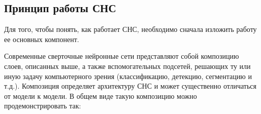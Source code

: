 \subsection{Принцип работы СНС}

Для того, чтобы понять, как работает СНС, необходимо сначала изложить работу ее основных компонент.





Современные сверточные нейронные сети представляют собой композицию слоев, описанных выше, а также вспомогательных подсетей, решающих ту или иную задачу компьютерного зрения (классификацию, детекцию, сегментацию и т.д.). Композиция определяет архитектуру СНС и может существенно отличаться от модели к модели. В общем виде такую композицию можно продемонстрировать так:

